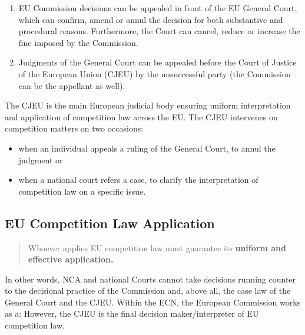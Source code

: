     \begin{enumerate}
        \item EU Commission decisions can be appealed in front of the EU General Court, which can confirm, amend or annul the decision for both substantive and procedural reasons. Furthermore, the Court can cancel, reduce or increase the fine imposed by the Commission.
        \item Judgments of the General Court can be appealed before the Court of Justice of the European Union (CJEU) by the unsuccessful party (the Commission can be the appellant as well).
    \end{enumerate}

    The CJEU is the main European judicial body ensuring uniform interpretation and application of competition law across the EU. The CJEU intervenes on competition matters on two occasions:
        \begin{itemize}
            \item when an individual appeals a ruling of the General Court, to annul the judgment or
            \item when a national court refers a case, to clarify the interpretation of competition law on a specific issue.
        \end{itemize}

    \subsection{EU Competition Law Application}

        \begin{quote}
            Whoever applies EU competition law must guarantee its \textbf{uniform and effective application.}
        \end{quote}

        In other words, NCA and national Courts cannot take decisions running counter to the decisional practice of the Commission and, above all, the case law of the General Court and the CJEU. Within the ECN, the European Commission works as a: However, the CJEU is the final decision maker/interpreter of EU competition law.

        
